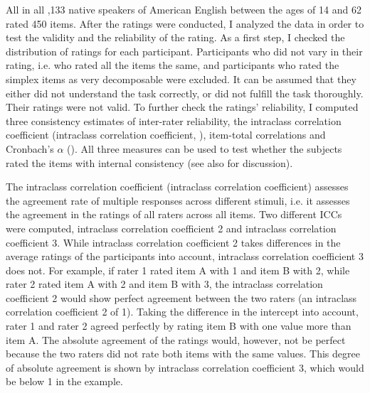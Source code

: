 All in all ,133 native speakers of American English between the ages of 14 and 62 rated 450 items. 
After the ratings were conducted, I analyzed the data in order to test the validity and the reliability of the rating. As a first step, I checked the distribution of ratings for each participant. Participants who did not vary in their rating, i.e. who rated all the items the same, and participants who rated the simplex items as very {decomposable} were excluded. It can be assumed that they either did not understand the task correctly, or did not fulfill the task thoroughly. Their ratings were not valid.
To further check the ratings' reliability, I computed three consistency estimates of inter-rater reliability, the intraclass correlation coefficient (intraclass correlation coefficient, \citealt{Bartko.1966}), item-total correlations and Cronbach's $\alpha$ (\citealt{Cronbach.1951}). All three measures can be used to test whether the subjects rated the items with internal consistency (see also \citealt[38 ff.]{Stemler.2008} for discussion). 

The intraclass correlation coefficient (intraclass correlation coefficient) assesses the agreement rate of multiple responses across different stimuli, i.e. it assesses the agreement in the ratings of all raters across all items. Two different ICCs were computed, intraclass correlation coefficient 2 and intraclass correlation coefficient 3. While intraclass correlation coefficient 2 takes differences in the average ratings of the participants into account, intraclass correlation coefficient 3 does not. For example, if rater 1 rated item A with 1 and item B with 2, while rater 2 rated item A with 2 and item B with 3, the intraclass correlation coefficient 2 would show perfect agreement between the two raters (an intraclass correlation coefficient 2 of 1). Taking the difference in the intercept into account, rater 1 and rater 2 agreed perfectly by rating item B with one value more than item A. The absolute agreement of the ratings would, however, not be perfect because the two raters did not rate both items with the same values. This degree of absolute agreement is shown by intraclass correlation coefficient 3, which would be below 1 in the example.

